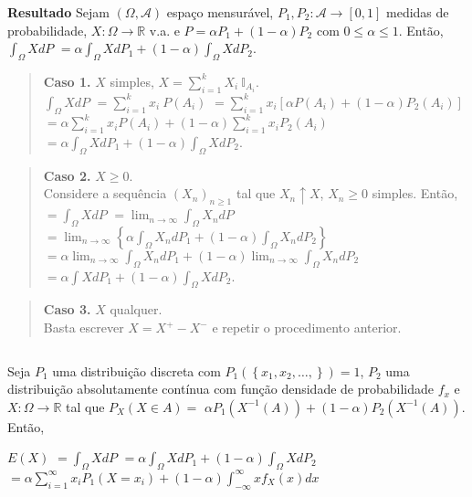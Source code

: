 \documentclass[
]{book}
\begin{document}
\(~\)

\(~\)

\textbf{Resultado} Sejam \((\Omega,\mathcal{A})\) espaço mensurável, \(P_1,P_2: \mathcal{A}\longrightarrow [0,1]\) medidas de probabilidade, \(X: \Omega \longrightarrow \mathbb{R}\) v.a. e \(P=\alpha P_1+(1-\alpha)P_2\) com \(0\leq\alpha\leq1\). Então,\(\displaystyle\int_\Omega XdP\) \(=\displaystyle\alpha \int_\Omega XdP_1 + (1-\alpha)\int_\Omega XdP_2\).

\begin{quote}
\textbf{Caso 1.} \(X\) simples, \(X=\displaystyle\sum_{i=1}^kX_i~\mathbb{I}_{A_i}\).\\
\(\displaystyle\int_\Omega XdP\) \(=\displaystyle\sum_{i=1}^kx_i~P(A_i)\) \(=\displaystyle\sum_{i=1}^k x_i[\alpha P(A_i)+(1-\alpha)P_2(A_i)]\) \(=\displaystyle\alpha \sum_{i=1}^k x_iP(A_i)+(1-\alpha)\sum_{i=1}^k x_iP_2(A_i)\) \(=\displaystyle\alpha \int_\Omega XdP_1+(1-\alpha)\int_\Omega XdP_2\).
\end{quote}

\begin{quote}
\textbf{Caso 2.} \(X \geq 0\).\\
Considere a sequência \(\left(X_n\right)_{n\geq 1}\) tal que \(X_n \uparrow X\), \(X_n \geq 0\) simples. Então,\\
\(=\displaystyle\int_\Omega XdP\) \(=\displaystyle\lim_{n\rightarrow\infty}\int_\Omega X_n dP\) \(=\displaystyle\lim_{n\rightarrow\infty}\left\{\alpha\int_\Omega X_ndP_1+(1-\alpha)\int_\Omega X_ndP_2\right\}\) \(=\displaystyle\alpha\lim_{n\rightarrow\infty}\int_\Omega X_ndP_1 + (1-\alpha)\lim_{n\rightarrow\infty}\int_\Omega X_n dP_2\) \(=\displaystyle\alpha\int XdP_1 + (1-\alpha)\int_\Omega XdP_2\).
\end{quote}

\begin{quote}
\textbf{Caso 3.} \(X\) qualquer.\\
Basta escrever \(X=X^+-X^-\) e repetir o procedimento anterior.
\end{quote}

\(~\)

Seja \(P_1\) uma distribuição discreta com \(P_1\left(\left\{x_1,x_2,\ldots,\right\}\right)=1\), \(P_2\) uma distribuição absolutamente contínua com função densidade de probabilidade \(f_x\) e \(X:\Omega \longrightarrow \mathbb{R}\) tal que \(P_X(X \in A)=\) \(\alpha P_1\left(X^{-1}(A)\right)+(1-\alpha)P_2\left(X^{-1}(A)\right)\). Então,

\(E(X)\) \(=\displaystyle\int_\Omega XdP\) \(=\displaystyle\alpha \int_\Omega XdP_1 + (1-\alpha)\int_\Omega XdP_2\) \(=\displaystyle\alpha \sum_{i=1}^\infty x_iP_1(X=x_i)+(1-\alpha)\int_{-\infty}^\infty x f_X(x)dx\)
\end{document}
